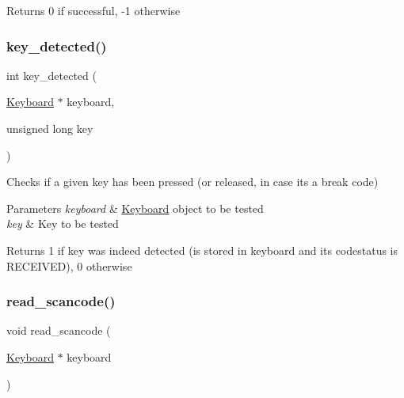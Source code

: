 \begin{DoxyReturn}{Returns}
0 if successful, -\/1 otherwise 
\end{DoxyReturn}
\hypertarget{group__keyboard_gaa472854b178776886c9bf568945db9c6}{}\label{group__keyboard_gaa472854b178776886c9bf568945db9c6} 
\subsubsection{\texorpdfstring{key\+\_\+detected()}{key\_detected()}}
{\footnotesize\ttfamily int key\+\_\+detected (\begin{DoxyParamCaption}\item[{\hyperlink{struct_keyboard}{Keyboard} $\ast$}]{keyboard,  }\item[{unsigned long}]{key }\end{DoxyParamCaption})}



Checks if a given key has been pressed (or released, in case it\textquotesingle{}s a break code) 


\begin{DoxyParams}{Parameters}
{\em keyboard} & \hyperlink{struct_keyboard}{Keyboard} \textquotesingle{}object\textquotesingle{} to be tested \\
\hline
{\em key} & Key to be tested \\
\hline
\end{DoxyParams}
\begin{DoxyReturn}{Returns}
1 if key was indeed detected (is stored in keyboard and its codestatus is R\+E\+C\+E\+I\+V\+ED), 0 otherwise 
\end{DoxyReturn}
\hypertarget{group__keyboard_ga97b5d5bf543266e60da0cc33c00aefad}{}\label{group__keyboard_ga97b5d5bf543266e60da0cc33c00aefad} 
\subsubsection{\texorpdfstring{read\+\_\+scancode()}{read\_scancode()}}
{\footnotesize\ttfamily void read\+\_\+scancode (\begin{DoxyParamCaption}\item[{\hyperlink{struct_keyboard}{Keyboard} $\ast$}]{keyboard }\end{DoxyParamCaption})}



